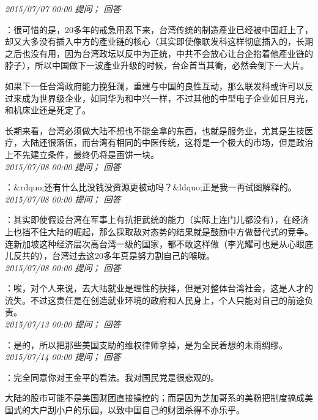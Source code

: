 \documentclass[twocolumn]{ctexart}
\begin{document}
\textit{\hfill\noindent\small 2015/07/07 00:00 提问； 回答}

：很可惜的是，20多年的戒急用忍下来，台湾传统的制造產业已经被中国赶上了，却又大多没有插入中方的產业链的核心（其实即使像联发科这样彻底插入的，长期之后也没有用，因为台湾政坛以反中为正统，中共不会放心让台企掐着他產业链的脖子），所以中国做下一波產业升级的时候，台企首当其衝，必然会倒下一大片。

如果下一任台湾政府能力挽狂澜，重建与中国的良性互动，那么联发科或许可以反过来成为世界级企业，如同华为和中兴一样，不过其他的中型电子企业如日月光，和机床业还是死定了。

长期来看，台湾必须做大陆不想也不能全拿的东西，也就是服务业，尤其是生技医疗，大陆还很落伍，而台湾有相同的中医传统，这将是一个极大的市场，但是政治上不先建立条件，最终仍将是画饼一块。\\

\textit{\hfill\noindent\small 2015/07/08 00:00 提问； 回答}

：\&rdquo;还有什么比没钱没资源更被动吗？\&ldquo;正是我一再试图解释的。\\

\textit{\hfill\noindent\small 2015/07/08 00:00 提问； 回答}

：其实即使假设台湾在军事上有抗拒武统的能力（实际上连门儿都没有），在经济上也挡不住大陆的崛起，那么採取敌对态势的结果就是鼓励中方做替代式的竞争。连新加坡这种经济层次高台湾一级的国家，都不敢这样做（李光耀可也是从心眼底儿反共的），台湾过去这20多年真是努力割自己的喉咙。\\

\textit{\hfill\noindent\small 2015/07/08 00:00 提问； 回答}

：唉，对个人来说，去大陆就业是理性的抉择，但是对整体台湾社会，这是人才的流失。不过这责任是在创造就业环境的政府和人民身上，个人只能对自己的前途负责。\\

\textit{\hfill\noindent\small 2015/07/13 00:00 提问； 回答}

：是的，所以把那些美国支助的维权律师拿掉，是为全民着想的未雨绸缪。\\

\textit{\hfill\noindent\small 2015/07/14 00:00 提问； 回答}

：完全同意你对王金平的看法。我对国民党是很悲观的。

大陆的股市可能不是美国财团直接操控的；而是因为芝加哥系的美粉把制度搞成美国式的大户刮小户的乐园，以致中国自己的财团杀得不亦乐乎。\\
\end{document}
